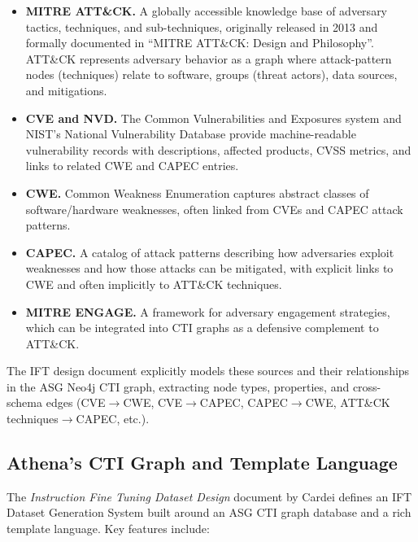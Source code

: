 \documentclass[10pt]{article}
\begin{document}
\begin{itemize}[leftmargin=*]
  \item \textbf{MITRE ATT\&CK.} A globally accessible knowledge base of adversary tactics, techniques, and sub-techniques, originally released in 2013 and formally documented in ``MITRE ATT\&CK: Design and Philosophy''.\cite{strom2018mitreattck} ATT\&CK represents adversary behavior as a graph where attack-pattern nodes (techniques) relate to software, groups (threat actors), data sources, and mitigations.
  \item \textbf{CVE and NVD.} The Common Vulnerabilities and Exposures system and NIST’s National Vulnerability Database provide machine-readable vulnerability records with descriptions, affected products, CVSS metrics, and links to related CWE and CAPEC entries.\cite{mitreCVE}
  \item \textbf{CWE.} Common Weakness Enumeration captures abstract classes of software/hardware weaknesses, often linked from CVEs and CAPEC attack patterns.\cite{mitreCWE}
  \item \textbf{CAPEC.} A catalog of attack patterns describing how adversaries exploit weaknesses and how those attacks can be mitigated, with explicit links to CWE and often implicitly to ATT\&CK techniques.\cite{mitreCAPEC}
  \item \textbf{MITRE ENGAGE.} A framework for adversary engagement strategies, which can be integrated into CTI graphs as a defensive complement to ATT\&CK.\cite{cardei2025ift}
\end{itemize}

The IFT design document explicitly models these sources and their relationships in the ASG Neo4j CTI graph, extracting node types, properties, and cross-schema edges (CVE$\rightarrow$CWE, CVE$\rightarrow$CAPEC, CAPEC$\rightarrow$CWE, ATT\&CK techniques$\rightarrow$CAPEC, etc.).\cite{cardei2025ift}

\subsection{Athena’s CTI Graph and Template Language}

The \emph{Instruction Fine Tuning Dataset Design} document by Cardei defines an IFT Dataset Generation System built around an ASG CTI graph database and a rich template language.\cite{cardei2025ift} Key features include:
\end{document}
